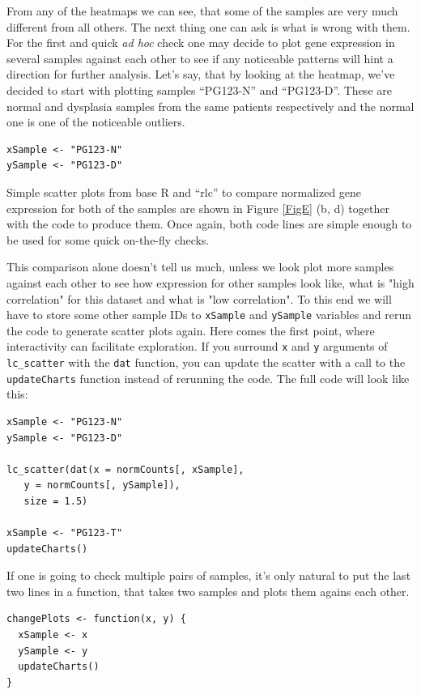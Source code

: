 \documentclass[twocolumn,10pt]{article}
\begin{document}
From any of the heatmaps we can see, that some of the samples are very much different from all others. The next thing one can ask is what is wrong with them. For the first and quick \emph{ad hoc} check one may decide to plot gene expression in several samples against each other to see if any noticeable patterns will hint a direction for further analysis. Let's say, that by looking at the heatmap, we've decided to start with plotting samples ``PG123-N'' and ``PG123-D''. These are normal and dysplasia samples from the same patients respectively and the normal one is one of the noticeable outliers.

\begin{verbatim}
xSample <- "PG123-N"
ySample <- "PG123-D"
\end{verbatim}

Simple scatter plots from base R and ``rlc'' to compare normalized gene expression for both of the samples are shown in Figure \ref{FigE} (b, d) together with the code to produce them. Once again, both code lines are simple enough to be used for some quick on-the-fly checks.

This comparison alone doesn't tell us much, unless we look plot more samples against each other to see how expression for other samples look like, what is "high correlation" for this dataset and what is "low correlation". To this end we will have to store some other sample IDs to \texttt{xSample} and \texttt{ySample} variables and rerun the code to generate scatter plots again. Here comes the first point, where interactivity can facilitate exploration. If you surround \texttt{x} and \texttt{y} arguments of \texttt{lc_scatter} with the \texttt{dat} function, you can update the scatter with a call to the \texttt{updateCharts} function instead of rerunning the code. The full code will look like this:

\begin{verbatim}
xSample <- "PG123-N"
ySample <- "PG123-D"

lc_scatter(dat(x = normCounts[, xSample], 
   y = normCounts[, ySample]),
   size = 1.5)

xSample <- "PG123-T"
updateCharts()
\end{verbatim}

If one is going to check multiple pairs of samples, it's only natural to put the last two lines in a function, that takes two samples and plots them agains each other.

\begin{verbatim}
changePlots <- function(x, y) {
  xSample <- x
  ySample <- y
  updateCharts()
}
\end{verbatim}
\end{document}
